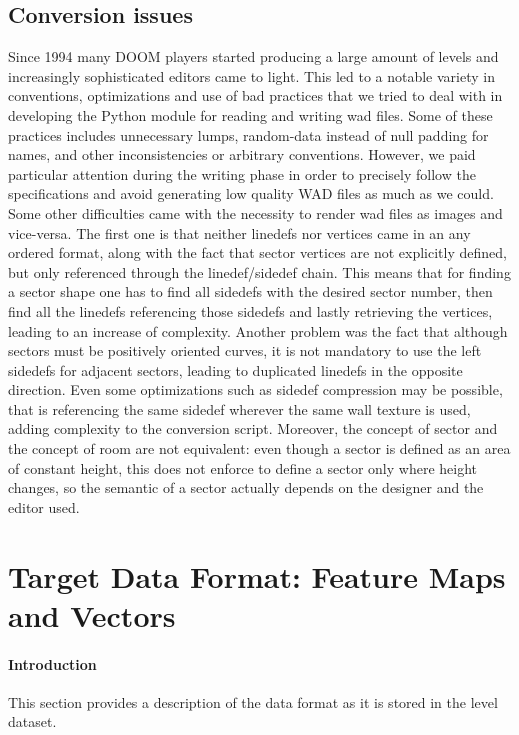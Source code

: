 \subsection{Conversion issues} 
Since 1994 many DOOM players started producing a large amount of levels and increasingly sophisticated editors came to light. This led to a notable variety in conventions, optimizations and use of bad practices that we tried to deal with in developing the Python module for reading and writing wad files. Some of these practices includes unnecessary lumps, random-data instead of null padding for names, and other inconsistencies or arbitrary conventions. 
However, we paid particular attention during the writing phase in order to precisely follow the specifications and avoid generating low quality WAD files as much as we could.
Some other difficulties came with the necessity to render wad files as images and vice-versa. The first one is that neither \glspl{linedef} nor vertices came in an any ordered format, along with the fact that sector vertices are not explicitly defined, but only referenced through the linedef/sidedef chain. This means that for finding a sector shape one has to find all sidedefs with the desired sector number, then find all the linedefs referencing those sidedefs and lastly retrieving the vertices, leading to an increase of complexity. Another problem was the fact that although sectors must be positively oriented curves, it is not mandatory to use the left sidedefs for adjacent sectors, leading to duplicated linedefs in the opposite direction. Even some optimizations such as sidedef compression may be possible, that is referencing the same sidedef wherever the same wall texture is used, adding complexity to the conversion script. Moreover, the concept of sector and the concept of room are not equivalent: even though a sector is defined as an area of constant height, this does not enforce to define a sector only where height changes, so the semantic of a sector actually depends on the designer and the editor used. 


\section{Target Data Format: Feature Maps and Vectors}
\label{sec:TargetFormat}
\paragraph{Introduction} This section provides a description of the data format as it is stored in the level dataset.
